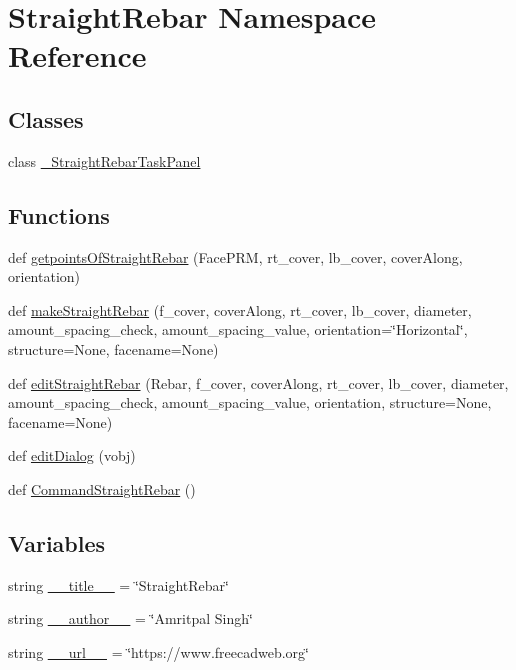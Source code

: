 \hypertarget{namespaceStraightRebar}{}\section{Straight\+Rebar Namespace Reference}
\label{namespaceStraightRebar}
\subsection*{Classes}
\begin{DoxyCompactItemize}
\item 
class \hyperlink{classStraightRebar_1_1__StraightRebarTaskPanel}{\+\_\+\+Straight\+Rebar\+Task\+Panel}
\end{DoxyCompactItemize}
\subsection*{Functions}
\begin{DoxyCompactItemize}
\item 
def \hyperlink{namespaceStraightRebar_a1873c6f7f59b355a64fdd966ad75f778}{getpoints\+Of\+Straight\+Rebar} (Face\+P\+RM, rt\+\_\+cover, lb\+\_\+cover, cover\+Along, orientation)
\item 
def \hyperlink{namespaceStraightRebar_af6270367d7beae457813e33718d80faf}{make\+Straight\+Rebar} (f\+\_\+cover, cover\+Along, rt\+\_\+cover, lb\+\_\+cover, diameter, amount\+\_\+spacing\+\_\+check, amount\+\_\+spacing\+\_\+value, orientation=\char`\"{}Horizontal\char`\"{}, structure=None, facename=None)
\item 
def \hyperlink{namespaceStraightRebar_ab4c578165b01dd7c7d121e5345de2d7b}{edit\+Straight\+Rebar} (Rebar, f\+\_\+cover, cover\+Along, rt\+\_\+cover, lb\+\_\+cover, diameter, amount\+\_\+spacing\+\_\+check, amount\+\_\+spacing\+\_\+value, orientation, structure=None, facename=None)
\item 
def \hyperlink{namespaceStraightRebar_ad48f93922ce90bb63d051c7c3c794d35}{edit\+Dialog} (vobj)
\item 
def \hyperlink{namespaceStraightRebar_a30f7aada2e2f91cdfae8267da36fe277}{Command\+Straight\+Rebar} ()
\end{DoxyCompactItemize}
\subsection*{Variables}
\begin{DoxyCompactItemize}
\item 
string \hyperlink{namespaceStraightRebar_ab1d45eb17133c23d9d6a3e2a6f2abb8a}{\+\_\+\+\_\+title\+\_\+\+\_\+} = \char`\"{}Straight\+Rebar\char`\"{}
\item 
string \hyperlink{namespaceStraightRebar_ad355d40e3bea5e86c24b6fe813264413}{\+\_\+\+\_\+author\+\_\+\+\_\+} = \char`\"{}Amritpal Singh\char`\"{}
\item 
string \hyperlink{namespaceStraightRebar_aebf23f453d8fabed3a611d14f5e7f057}{\+\_\+\+\_\+url\+\_\+\+\_\+} = \char`\"{}https\+://www.\+freecadweb.\+org\char`\"{}
\end{DoxyCompactItemize}


